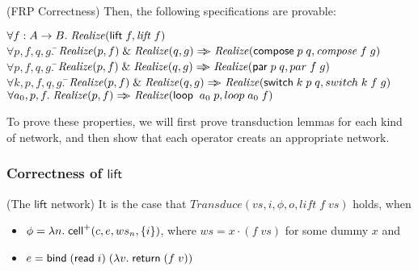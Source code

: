 \begin{prop}{(FRP Correctness)}
Then, the following specifications are provable: 
\begin{tabbing}
$\forall f:A\to B.\; \mathit{Realize}(\mathsf{lift}\; f, \mathit{lift}\;f)$ \\[1em]

$\forall p, f, q, g.\;$\=$\mathit{Realize}(p, f) \;\&\; \mathit{Realize}(q, g) \Rightarrow\!\!\!> \mathit{Realize}(\mathsf{compose}\; p\;q, \mathit{compose}\;f\;g)$ \\[1em]

$\forall p, f, q, g.\;$\=$\mathit{Realize}(p, f) \;\&\; \mathit{Realize}(q, g)
                       \Rightarrow\!\!\!> \mathit{Realize}(\mathsf{par}\; p\;q, par\;f\;g)$ \\[1em]

$\forall k, p, f, q, g.\;$\=$\mathit{Realize}(p, f) \;\&\; \mathit{Realize}(q, g)
                          \Rightarrow\!\!\!> \mathit{Realize}(\mathsf{switch}\; k\;p\;q, switch\;k\;f\;g)$ \\[1em]

$\forall a_0, p, f.\; 
  \mathit{Realize}(p, f) \Rightarrow\!\!\!> \mathit{Realize}(\mathsf{loop}\;\;a_0\;p, loop\;a_0\;f)$
\end{tabbing}
\end{prop}

\noindent To prove these properties, we will first prove transduction lemmas for each kind of 
network, and then show that each operator creats an appropriate network. 

\subsubsection{Correctness of $\mathsf{lift}$}

\begin{lemma}{(The $\mathsf{lift}$ network)}
It is the case that $\mathit{Transduce}(vs, i, \phi, o, \mathit{lift}\;f\;vs)$ holds, when
\begin{itemize}
\item $\phi = \lambda n.\;\mathsf{cell}^{+}({c}, {e}, {ws_n}, {\{{i}\}})$, where $ws = x \cdot (f\;vs)$ for some dummy $x$ and
\item $e = \mathsf{bind}\; (\mathsf{read}\; i)\; (\lambda v.\;\mathsf{return}\; (f\;v))$
\end{itemize}
\end{lemma}


